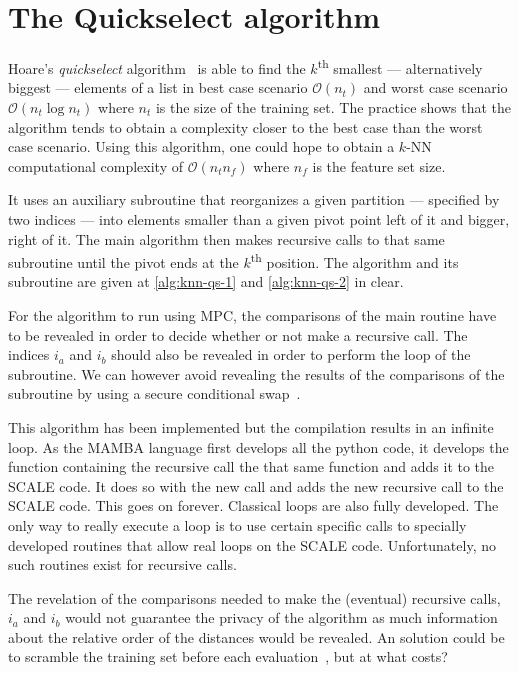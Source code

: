 \chapter{The Quickselect algorithm}
\label{app:qs}
Hoare's \emph{quickselect} algorithm~\cite{Hoare:1961:AF:366622.366647} is able to find the $k$\textsuperscript{th} smallest --- alternatively biggest --- elements of a list in best case scenario $\mathcal{O}\left(n_t\right)$ and worst case scenario $\mathcal{O}\left(n_t \log n_t\right)$ where $n_t$ is the size of the training set. The practice shows that the algorithm tends to obtain a complexity closer to the best case than the worst case scenario. Using this algorithm, one could hope to obtain a $k$-NN computational complexity of $\mathcal{O}\left(n_tn_f\right)$ where $n_f$ is the feature set size. 

It uses an auxiliary subroutine that reorganizes a given partition --- specified by two indices --- into elements smaller than a given pivot point left of it and bigger, right of it. The main algorithm then makes recursive calls to that same subroutine until the pivot ends at the $k$\textsuperscript{th} position. The algorithm and its subroutine are given at \ref{alg:knn-qs-1} and \ref{alg:knn-qs-2} in clear.

For the algorithm to run using MPC, the comparisons of the main routine have to be revealed in order to decide whether or not make a recursive call. The indices $i_a$ and $i_b$ should also be revealed in order to perform the loop of the subroutine. We can however avoid revealing the results of the comparisons of the subroutine by using a secure conditional swap~\cite{Aly2014SecurelyProblems}.

This algorithm has been implemented but the compilation results in an infinite loop. As the MAMBA language first develops all the python code, it develops the function containing the recursive call the that same function and adds it to the SCALE code. It does so with the new call and adds the new recursive call to the SCALE code. This goes on forever. Classical loops are also fully developed. The only way to really execute a loop is to use certain specific calls to specially developed routines that allow real loops on the SCALE code. Unfortunately, no such routines exist for recursive calls.

 The revelation of the comparisons needed to make the (eventual) recursive calls, $i_a$ and $i_b$ would not guarantee the privacy of the algorithm as much information about the relative order of the distances would be revealed. An solution could be to scramble the training set before each evaluation~\cite{QiEfficient}, but at what costs?
 
